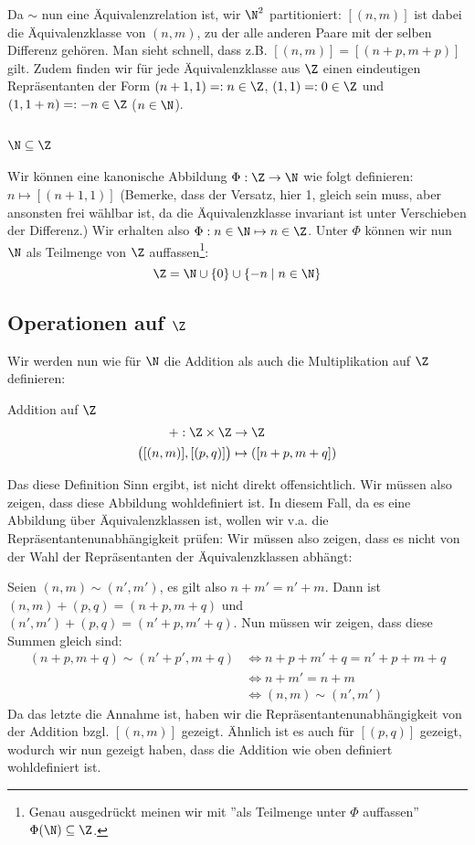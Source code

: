 Da $\sim$ nun eine Äquivalenzrelation ist, wir $\N^2$ partitioniert: $[(n,m)]$ ist dabei die Äquivalenzklasse von $(n,m)$, zu der alle anderen Paare mit der selben Differenz gehören. Man sieht schnell, dass z.B. $[(n,m)] = [(n + p,m + p)]$ gilt. Zudem finden wir für jede Äquivalenzklasse aus $\Z$ einen eindeutigen Repräsentanten der Form $(n+1, 1) =: n \in \Z$, $(1, 1) =: 0 \in \Z$ und $(1, 1+n) =: -n \in \Z$ ($n \in \N$).

\subsection{$\N \subseteq \Z$}
Wir können eine kanonische Abbildung $\Phi: \Z \to \N$ wie folgt definieren:  $n \mapsto [(n+1,1)]$ (Bemerke, dass der Versatz, hier 1, gleich sein muss, aber ansonsten frei wählbar ist, da die Äquivalenzklasse invariant ist unter Verschieben der Differenz.) Wir erhalten also $\Phi: n \in \N \mapsto n \in \Z$. Unter $\Phi$ können wir nun $\N$ als Teilmenge von $\Z$ auffassen\footnote{Genau ausgedrückt meinen wir mit ''als Teilmenge unter $\Phi$ auffassen'' $\Phi(\N) \subseteq \Z$.}:
$$ \Z = \N \cup \{0\} \cup \{-n \mid n \in \N\}$$


\subsection{Operationen auf $\Z$}
Wir werden nun wie für $\N$ die Addition als auch die Multiplikation auf $\Z$ definieren:
\begin{definition}{Addition auf $\Z$}{}
\begin{align*}
    +: \Z \times \Z &\to \Z\\
    \big([(n,m)], [(p, q)]\big) &\mapsto ([n + p, m + q])
\end{align*}
\end{definition}
Das diese Definition Sinn ergibt, ist nicht direkt offensichtlich. Wir müssen also zeigen, dass diese Abbildung wohldefiniert ist. In diesem Fall, da es eine Abbildung über Äquivalenzklassen ist, wollen wir v.a. die Repräsentantenunabhängigkeit prüfen: Wir müssen also zeigen, dass es nicht von der Wahl der Repräsentanten der Äquivalenzklassen abhängt:

Seien $(n,m) \sim (n',m')$, es gilt also $n + m' = n' + m$. Dann ist $(n,m) + (p,q) = (n+p,m+q)$ und $(n',m') + (p,q) = (n'+p, m'+q)$. Nun müssen wir zeigen, dass diese Summen gleich sind:
\begin{align*}
(n+p,m+q) \sim (n'+p',m+q) &\iff n+p+m'+q=n'+p+m+q\\
                        &\iff n+m'=n+m\\
                        &\iff (n,m) \sim (n',m')
\end{align*}
Da das letzte die Annahme ist, haben wir die Repräsentantenunabhängigkeit von der Addition bzgl. $[(n,m)]$ gezeigt. Ähnlich ist es auch für $[(p,q)]$ gezeigt, wodurch wir nun gezeigt haben, dass die Addition wie oben definiert wohldefiniert ist.


